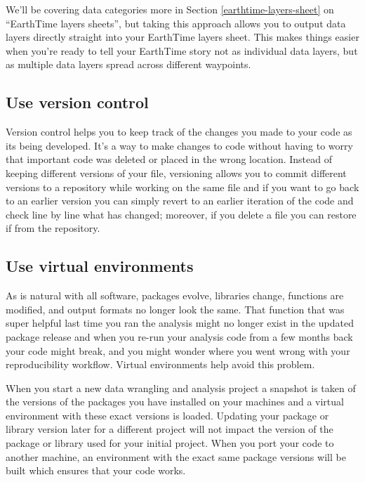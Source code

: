 \documentclass[
]{krantz}
\begin{document}
We'll be covering data categories more in Section \ref{earthtime-layers-sheet} on ``EarthTime layers sheets'', but taking this approach allows you to output data layers directly straight into your EarthTime layers sheet. This makes things easier when you're ready to tell your EarthTime story not as individual data layers, but as multiple data layers spread across different waypoints.

\hypertarget{use-version-control}{%
\subsection*{Use version control}\label{use-version-control}}


Version control helps you to keep track of the changes you made to your code as its being developed. It's a way to make changes to code without having to worry that important code was deleted or placed in the wrong location. Instead of keeping different versions of your file, versioning allows you to commit different versions to a repository while working on the same file and if you want to go back to an earlier version you can simply revert to an earlier iteration of the code and check line by line what has changed; moreover, if you delete a file you can restore if from the repository.

\hypertarget{use-virtual-environments}{%
\subsection*{Use virtual environments}\label{use-virtual-environments}}


As is natural with all software, packages evolve, libraries change, functions are modified, and output formats no longer look the same. That function that was super helpful last time you ran the analysis might no longer exist in the updated package release and when you re-run your analysis code from a few months back your code might break, and you might wonder where you went wrong with your reproducibility workflow. Virtual environments help avoid this problem.

When you start a new data wrangling and analysis project a snapshot is taken of the versions of the packages you have installed on your machines and a virtual environment with these exact versions is loaded. Updating your package or library version later for a different project will not impact the version of the package or library used for your initial project. When you port your code to another machine, an environment with the exact same package versions will be built which ensures that your code works.
\end{document}
